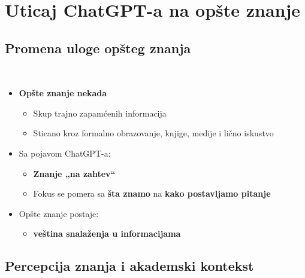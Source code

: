 \documentclass{beamer}
\newcommand{\frametitlesection}{
    \raggedright
    \insertsubsectionhead\\[-2pt]
    {\small \insertsectionhead}
}
\begin{document}
\section{Uticaj ChatGPT-a na opšte znanje}
\subsection{Promena uloge opšteg znanja}

\begin{frame}{\frametitlesection}
\begin{itemize}
    \item \textbf{Opšte znanje nekada}
    \begin{itemize}
        \item Skup trajno zapamćenih informacija 
        \item Sticano kroz formalno obrazovanje, knjige, medije i lično iskustvo
    \end{itemize}
    \item Sa pojavom ChatGPT-a:
    \begin{itemize}
        \item \textbf{Znanje „na zahtev“}
        \item Fokus se pomera sa \textbf{šta znamo} na \textbf{kako postavljamo pitanje}
    \end{itemize}
    \item Opšte znanje postaje:
    \begin{itemize}
        \item \textbf{veština snalaženja u informacijama}
    \end{itemize}
\end{itemize}
\end{frame}


\subsection{Percepcija znanja i akademski kontekst}
\end{document}
